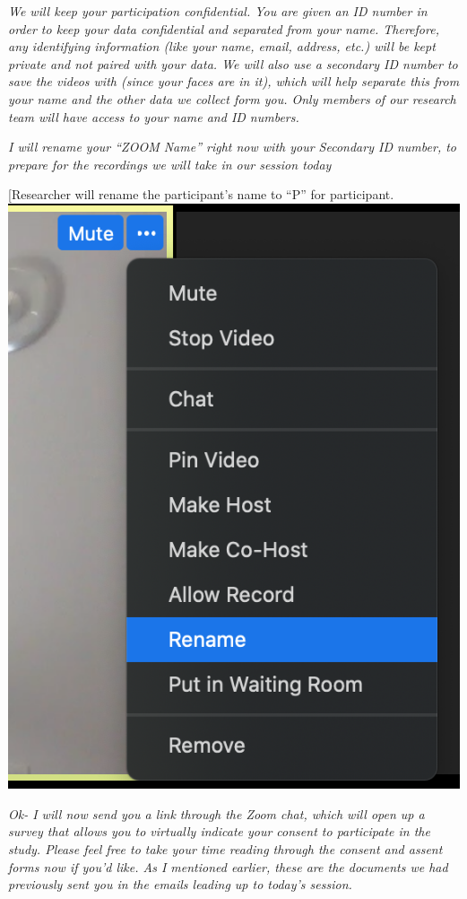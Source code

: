 \documentclass[]{book}
\begin{document}
\emph{We will keep your participation confidential. You are given an ID number in order to keep your data confidential and separated from your name. Therefore, any identifying information (like your name, email, address, etc.) will be kept private and not paired with your data. We will also use a secondary ID number to save the videos with (since your faces are in it), which will help separate this from your name and the other data we collect form you. Only members of our research team will have access to your name and ID numbers.}

\emph{I will rename your ``ZOOM Name'' right now with your Secondary ID number, to prepare for the recordings we will take in our session today}

{[}Researcher will rename the participant's name to ``P'' for participant. \includegraphics{images/zoom_parent_child_interaction/1.png}

\emph{Ok- I will now send you a link through the Zoom chat, which will open up a survey that allows you to virtually indicate your consent to participate in the study. Please feel free to take your time reading through the consent and assent forms now if you'd like. As I mentioned earlier, these are the documents we had previously sent you in the emails leading up to today's session.}
\end{document}
